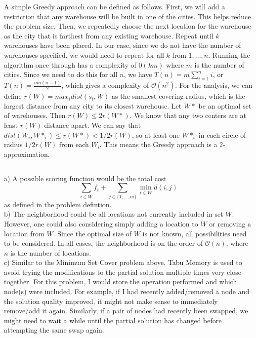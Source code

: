 \documentclass{article}
\begin{document}
A simple Greedy approach can be defined as follows. First, we will add a restriction that any warehouse will be built in one of the cities. This helps reduce the problem size. Then, we repeatedly choose the next location for the warehouse as the city that is farthest from any existing warehouse. Repeat until $k$ warehouses have been placed. In our case, since we do not have the number of warehouses specified, we would need to repeat for all $k$ from $1,...,n$. Running the algorithm once through has a complexity of $\mathcal{0}(km)$ where $m$ is the number of cities. Since we need to do this for all $n$, we have $T(n) = m\sum_{i=1}^{n}i$, or $T(n)=\frac{mn(n-1)}{2}$, which gives a complexity of $\mathcal{O}(n^2)$. For the analysis, we can define $r(W)=max_i dist(s_i, W)$ as the smallest covering radius, which is the largest distance from any city to its closest warehouse. Let $W*$ be an optimal set of warehouses. Then $r(W) \leq 2r(W*)$. We know that any two centers are at least $r(W)$ distance apart. We can say that $dist(W_i, W*_i) \leq r(W*) < 1/2 r(W)$, so at least one $W*_i$ in each circle of radius $1/2 r(W)$ from each $W_i$. This means the Greedy approach is a 2-approximation.

\subsection{}

a) A possible scoring function would be the total cost $$\sum_{i \in W} f_i + \sum_{j \in \{1,...,m\}} \min_{i \in W} d(i, j)$$ as defined in the problem defintion.\\

b) The neighborhood could be all locations not currently included in set $W$. However, one could also considering simply adding a location to $W$ or removing a location from $W$. Since the optimal size of $W$ is not known, all possibilities need to be considered. In all cases, the neighborhood is on the order of $\mathcal{O}(n)$, where $n$ is the number of locations.\\

c) Similar to the Minimum Set Cover problem above, Tabu Memory is used to avoid trying the modifications to the partial solution multiple times very close together. For this problem, I would store the operation performed and which node(s) were included. For example, if I had recently added/removed a node and the solution quality improved, it might not make sense to immediately remove/add it again. Similarly, if a pair of nodes had recently been swapped, we might need to wait a while until the partial solution has changed before attempting the same swap again.\\
\end{document}
